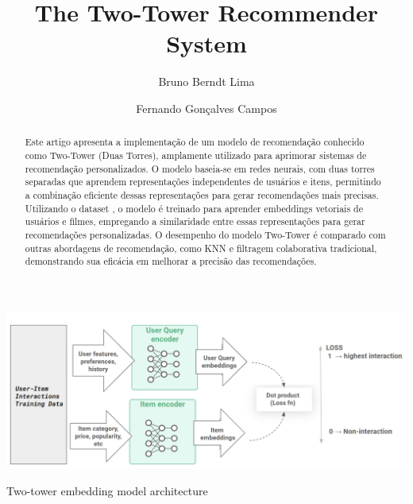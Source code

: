 \documentclass[sigconf]{acmart}
\begin{document}
\title{The Two-Tower Recommender System}


\author{Bruno Berndt Lima}

\author{Fernando Gonçalves Campos}

\begin{teaserfigure}
  \includegraphics[width=\textwidth]{two_tower_model.png}
  \caption{Two-tower embedding model architecture}
  \label{fig:teaser}
\end{teaserfigure}


\begin{abstract}
  Este artigo apresenta a implementação de um modelo de recomendação conhecido como Two-Tower (Duas Torres), amplamente utilizado para aprimorar sistemas de recomendação personalizados. O modelo baseia-se em redes neurais, com duas torres separadas que aprendem representações independentes de usuários e itens, permitindo a combinação eficiente dessas representações para gerar recomendações mais precisas. Utilizando o dataset \cite{MovieLens}, o modelo é treinado para aprender embeddings vetoriais de usuários e filmes, empregando a similaridade entre essas representações para gerar recomendações personalizadas. O desempenho do modelo Two-Tower é comparado com outras abordagens de recomendação, como KNN e filtragem colaborativa tradicional, demonstrando sua eficácia em melhorar a precisão das recomendações.
\end{abstract}


\maketitle
\end{document}
